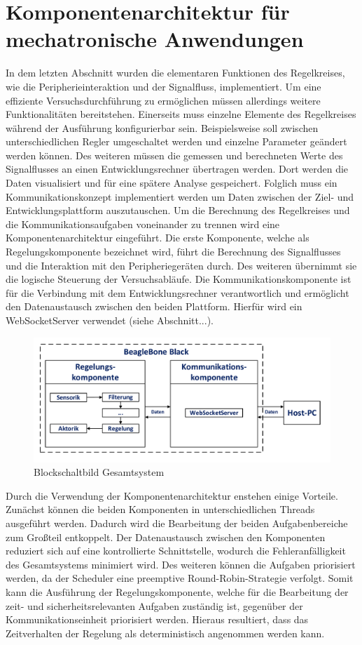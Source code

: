 \section{Komponentenarchitektur für mechatronische Anwendungen}
In dem letzten Abschnitt wurden die elementaren Funktionen des Regelkreises, wie die Peripherieinteraktion und der Signalfluss, implementiert. Um eine effiziente Versuchsdurchführung zu ermöglichen müssen allerdings weitere Funktionalitäten bereitstehen. Einerseits muss einzelne Elemente des Regelkreises während der Ausführung konfigurierbar sein. Beispielsweise soll zwischen unterschiedlichen Regler umgeschaltet werden und einzelne Parameter geändert werden können. Des weiteren müssen die gemessen und berechneten Werte des Signalflusses an einen Entwicklungsrechner übertragen werden. Dort werden die Daten visualisiert und für eine spätere Analyse gespeichert.
Folglich muss ein Kommunikationskonzept implementiert werden um Daten zwischen der Ziel- und Entwicklungsplattform auszutauschen. Um die Berechnung des Regelkreises und die Kommunikationsaufgaben voneinander zu trennen wird eine Komponentenarchitektur eingeführt. Die erste Komponente, welche als Regelungskomponente bezeichnet wird, führt die Berechnung des Signalflusses und die Interaktion mit den Peripheriegeräten durch. Des weiteren übernimmt sie die logische Steuerung der Versuchsabläufe. Die Kommunikationskomponente ist für die Verbindung mit dem Entwicklungsrechner verantwortlich und ermöglicht den Datenaustausch zwischen den beiden Plattform. Hierfür wird ein WebSocketServer verwendet (siehe Abschnitt...).
\begin{figure}[!h]
\centering
\includegraphics[width=\linewidth]{img/SW_1_KA_BSB.pdf}
\caption{Blockschaltbild Gesamtsystem}
\end{figure}
Durch die Verwendung der Komponentenarchitektur enstehen einige Vorteile. Zunächst können die beiden Komponenten in unterschiedlichen Threads ausgeführt werden. Dadurch wird die Bearbeitung der beiden Aufgabenbereiche zum Großteil entkoppelt. Der Datenaustausch zwischen den Komponenten reduziert sich auf eine kontrollierte Schnittstelle, wodurch die Fehleranfälligkeit des Gesamtsystems minimiert wird. Des weiteren können die Aufgaben priorisiert werden, da der Scheduler eine preemptive Round-Robin-Strategie verfolgt. Somit kann die Ausführung der Regelungskomponente, welche für die Bearbeitung der zeit- und sicherheitsrelevanten Aufgaben zuständig ist, gegenüber der Kommunikationseinheit priorisiert werden. Hieraus resultiert, dass das Zeitverhalten der Regelung als deterministisch angenommen werden kann. 

